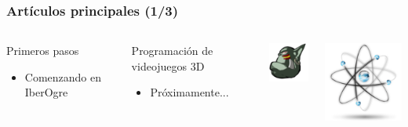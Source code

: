 \documentclass[green]{beamer}
\begin{document}
\begin{frame}
\transdissolve
    \frametitle{Artículos principales (1/3)}
        
    \begin{columns}[c]
    \column{200pt}
        
	\begin{block}{Primeros pasos}
            \begin{itemize}
                \item Comenzando en IberOgre
            \end{itemize}            
        \end{block}
	
	\begin{block}{Programación de videojuegos 3D}
            \begin{itemize}
                \item Próximamente...
            \end{itemize}            
        \end{block}

    \column{100pt}
        
	\begin{center}
	    \includegraphics[scale=0.5]{img/iberogre-cabeza.png}
	\end{center}
	
	\begin{center}
	    \includegraphics[scale=0.25]{img/atom.png}
	\end{center}
    \end{columns} 
\end{frame}
\end{document}
